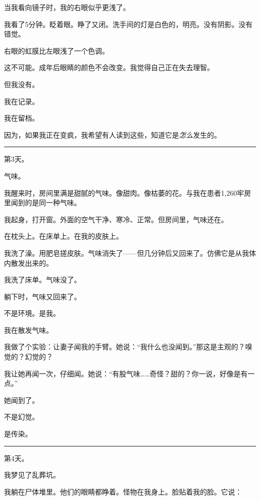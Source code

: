 \noindent 当我看向镜子时，我的右眼似乎更浅了。

\noindent 我看了5分钟。眨着眼。睁了又闭。洗手间的灯是白色的，明亮。没有阴影。没有错觉。

\noindent 右眼的虹膜比左眼浅了一个色调。

\noindent 这不可能。成年后眼睛的颜色不会改变。我觉得自己正在失去理智。

\noindent 但我没有。

\noindent 我在记录。

\noindent 我在留档。

\noindent 因为，如果我正在变疯，我希望有人读到这些，知道它是\textit{怎么}发生的。

\vspace{0.5em}\noindent\rule{\textwidth}{0.5pt}\vspace{0.5em}

\noindent 第3天。

\noindent 气味。

\noindent 我醒来时，房间里满是甜腻的气味。像甜肉。像枯萎的花。与我在患者1,260牢房里闻到的是同一种气味。

\noindent 我起身，打开窗。外面的空气干净、寒冷、正常。但房间里，气味还在。

\noindent 在枕头上。在床单上。在我的皮肤上。

\noindent 我洗了澡。用肥皂搓皮肤。气味消失了——但几分钟后又回来了。仿佛它是从我体内散发出来的。

\noindent 我洗了床单。气味没了。

\noindent 躺下时，气味又回来了。

\noindent 不是环境。是我。

\noindent 我在散发气味。

\noindent 我做了个实验：让妻子闻我的手臂。她说：“我什么也没闻到。”那这是主观的？嗅觉的？幻觉的？

\noindent 我让她再闻一次，仔细闻。她说：“有股气味……奇怪？甜的？你一说，好像是有一点。”

\noindent 她闻到了。

\noindent 不是幻觉。

\noindent 是传染。

\vspace{0.5em}\noindent\rule{\textwidth}{0.5pt}\vspace{0.5em}

\noindent 第4天。

\noindent 我梦见了乱葬坑。

\noindent 我躺在尸体堆里。他们的眼睛都睁着。怪物在我身上。脸贴着我的脸。它说：


